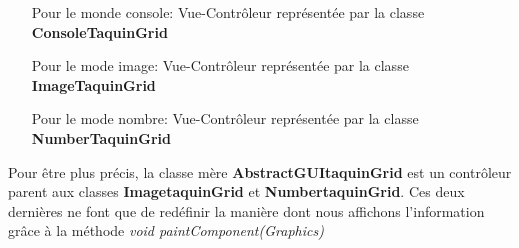 	\begin{itemize}
		\item [Pour le monde console:] Vue-Contrôleur représentée par la classe \textbf{ConsoleTaquinGrid}
		\item [Pour le mode image:]  Vue-Contrôleur représentée par la classe \textbf{ImageTaquinGrid}
		\item [Pour le mode nombre:]  Vue-Contrôleur représentée par la classe \textbf{NumberTaquinGrid}
	\end{itemize}

	Pour être plus précis, la classe mère \textbf{AbstractGUItaquinGrid} est un contrôleur parent aux classes \textbf{ImagetaquinGrid} et \textbf{NumbertaquinGrid}. Ces deux dernières ne font que de redéfinir la manière dont nous affichons l'information grâce à la méthode \textit{void paintComponent(Graphics)}
